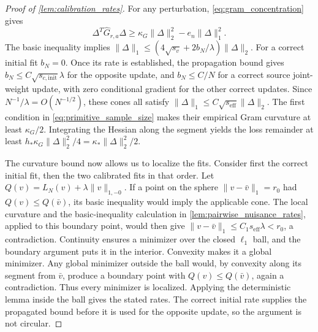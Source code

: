 \documentclass[12pt]{article}
\begin{document}
\begin{proof}[Proof of \cref{lem:calibration_rates}]
For any perturbation, \cref{eq:gram_concentration} gives
\[
\Delta^T\widehat G_{r,a}\Delta
\ge\kappa_G\|\Delta\|_2^2-e_n\|\Delta\|_1^2.
\]
The basic inequality implies
$\|\Delta\|_1\le(4\sqrt{s_v}+2b_N/\lambda)\|\Delta\|_2$.
For a correct initial fit $b_N=0$. Once its rate is established, the propagation bound gives $b_N\le C\sqrt{s_{c,\mathrm{init}}}\lambda$ for the opposite update, and $b_N\le C/N$ for a correct source joint-weight update, with zero conditional gradient for the other correct updates. Since $N^{-1}/\lambda=O(N^{-1/2})$, these cones all satisfy $\|\Delta\|_1\le C\sqrt{s_{\mathrm{eff}}}\|\Delta\|_2$. The first condition in \cref{eq:primitive_sample_size} makes their empirical Gram curvature at least $\kappa_G/2$. Integrating the Hessian along the segment yields the loss remainder at least $h_*\kappa_G\|\Delta\|_2^2/4=\kappa_*\|\Delta\|_2^2/2$.

The curvature bound now allows us to localize the fits. Consider first the correct initial fit, then the two calibrated fits in that order. Let $Q(v)=L_N(v)+\lambda\|v\|_{1,-0}$. If a point on the sphere $\|v-\bar v\|_1=r_0$ had $Q(v)\le Q(\bar v)$, its basic inequality would imply the applicable cone. The local curvature and the basic-inequality calculation in \cref{lem:pairwise_nuisance_rates}, applied to this boundary point, would then give
$\|v-\bar v\|_1\le C_1s_{\mathrm{eff}}\lambda<r_0$, a contradiction. Continuity ensures a minimizer over the closed $\ell_1$ ball, and the boundary argument puts it in the interior. Convexity makes it a global minimizer. Any global minimizer outside the ball would, by convexity along its segment from $\bar v$, produce a boundary point with $Q(v)\le Q(\bar v)$, again a contradiction. Thus every minimizer is localized. Applying the deterministic lemma inside the ball gives the stated rates. The correct initial rate supplies the propagated bound before it is used for the opposite update, so the argument is not circular.


\end{proof}
\end{document}
